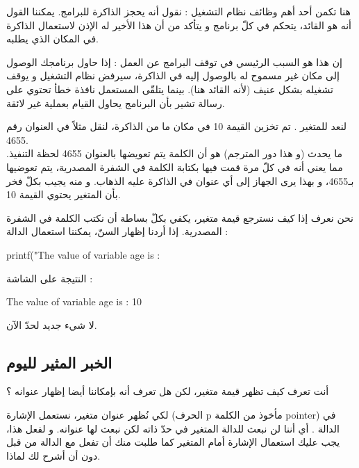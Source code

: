 هنا تكمن أحد أهم وظائف نظام التشغيل : نقول أنه يحجز الذاكرة للبرامج. يمكننا القول أنه هو القائد، يتحكم في كلّ برنامج و يتأكد من أن هذا الأخير له الإذن لاستعمال الذاكرة في المكان الذي يطلبه.
\begin{information}
إن هذا هو السبب الرئيسي في توقف البرامج عن العمل : إذا حاول برنامجك الوصول إلى مكان غير مسموح له بالوصول إليه في الذاكرة، سيرفض نظام التشغيل و يوقف تشغيله بشكل عنيف (لأنه القائد هنا). بينما يتلقّى المستعمل نافذة خطأ تحتوي على رسالة تشير بأن البرنامج يحاول القيام بعملية غير لائقة.
\end{information}
لنعد للمتغير
. تم تخزين القيمة 10 في مكان ما من الذاكرة، لنقل مثلاً في العنوان رقم 4655.\\
ما يحدث (و هذا دور المترجم) هو أن الكلمة
يتم تعويضها بالعنوان 4655 لحظة التنفيذ. مما يعني أنه في كلّ مرة قمت فيها بكتابة الكلمة
في الشفرة المصدرية، يتم تعوضيها بـ4655، و بهذا يرى الجهاز إلى أي عنوان في الذاكرة عليه الذهاب. و منه يجيب بكلّ فخر بأن المتغير
يحتوي القيمة 10.

نحن نعرف إذا كيف نسترجع قيمة متغير، يكفي بكلّ بساطة أن نكتب الكلمة
في الشفرة المصدرية. إذا أردنا إظهار السنّ، يمكننا استعمال الدالة
 :
\begin{Csource}
printf("The value of variable age is : %
\end{Csource}
النتيجة على الشاشة :
\begin{Console}
The value of variable age is : 10
\end{Console}
لا شيء جديد لحدّ الآن.

\subsection{الخبر المثير لليوم}
أنت تعرف كيف تظهر قيمة متغير، لكن هل تعرف أنه بإمكاننا أيضا إظهار عنوانه ؟

لكي نُظهر عنوان متغير، نستعمل الإشارة
(الحرف
\textenglish{p}
مأخوذ من الكلمة
\textenglish{pointer})
في الدالة
.
أي أننا لن نبعث للدالة
المتغير في حدّ ذاته لكن نبعث لها عنوانه. و لفعل هذا، يجب عليك استعمال الإشارة
\InlineCode{\&}
أمام المتغير
كما طلبت منك أن تفعل مع الدالة
من قبل دون أن أشرح لك لماذا.

